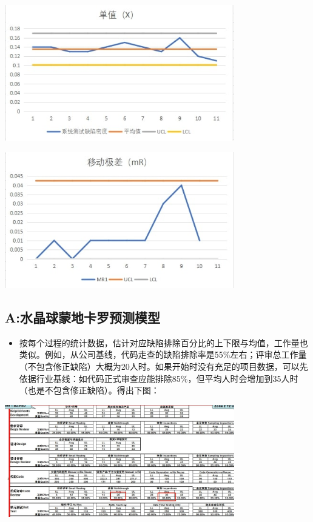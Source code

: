 \includegraphics[width=10cm]{微信截图_20210927084548.jpg}


\includegraphics[width=10cm]{微信截图_20210927084434.jpg}

\hypertarget{aux6c34ux6676ux7403ux8499ux5730ux5361ux7f57ux9884ux6d4bux6a21ux578b}{%
\subsection{A:水晶球蒙地卡罗预测模型}\label{aux6c34ux6676ux7403ux8499ux5730ux5361ux7f57ux9884ux6d4bux6a21ux578b}}

\begin{itemize}
\tightlist
\item
  按每个过程的统计数据，估计对应缺陷排除百分比的上下限与均值，工作量也类似。例如，从公司基线，代码走查的缺陷排除率是55\%左右；评审总工作量（不包含修正缺陷）大概为20人时。如果开始时没有充足的项目数据，可以先依据行业基线：如代码正式审查应能排除85\%，但平均人时会增加到35人时
  （也是不包含修正缺陷）。得出下图：
\end{itemize}


\includegraphics[width=10cm]{微信截图_20211027011246.jpg}

